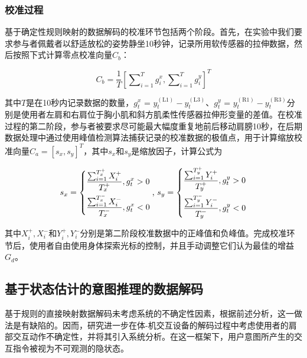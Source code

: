 \subsubsection{校准过程}
基于确定性规则映射的数据解码的校准环节包括两个阶段。首先，在实验中我们要求参与者佩戴者以舒适放松的姿势静坐10秒钟，记录所用软传感器的拉伸数据，然后按照下式计算零点校准向量$C_b$：

\begin{equation}
C_b = \frac{1}{T}{\left[ {\sum\nolimits_{i = 1}^T {{g^x_i}} ,\sum\nolimits_{i = 1}^T {{g^y_i}} } \right]^T}
\label{eq3}
\end{equation}    

其中$T$是在10秒内记录数据的数量，${g^x_t}{\text{ = }}y_t^{({\text{L}}1)} - y_t^{({\text{L}}3)}$、${g^y_t}{\text{ = }}y_t^{({\text{R}}1)} - y_t^{({\text{R}}3)}$分别是使用者左肩和右肩位于胸小肌和斜方肌柔性传感器拉伸形变量的差值。在校准过程的第二阶段，参与者被要求尽可能最大幅度重复地前后移动肩膀10秒，在后期数据处理中通过使用峰值检测算法捕获记录的校准数据的极值点，用于计算缩放校准向量$C_a = {[{s_x},{s_y}]^T}$，其中${s_x}$和${s_y}$是缩放因子，计算公式为

\begin{equation}
{s_x} = \left \{  \begin{gathered}
    \frac{{\sum\nolimits_{i = 1}^{T_x^ + } {X_i^ + } }}{{T_x^ + }},{g^x_t} > 0 \hfill  \\ 
    \frac{{\sum\nolimits_{i = 1}^{T_x^ - } {X_i^ - } }}{{T_x^ - }},{g^x_t} < 0 \hfill  \\  
  \end{gathered}  \right.{\text{, }}{s_y} = \left \{  \begin{gathered}
    \frac{{\sum\nolimits_{i = 1}^{T_y^ + } {Y_i^ + } }}{{T_y^ + }},{g^y_t} > 0 \hfill  \\ 
    \frac{{\sum\nolimits_{i = 1}^{T_y^ - } {Y_i^ - } }}{{T_y^ - }},{g^y_t} < 0 \hfill  \\  
  \end{gathered}  \right.
  \label{eq4}
\end{equation}    

其中$X_i^ + ,X_i^ - $和$Y_i^ + ,Y_i^ - $分别是第二阶段校准数据中的正峰值和负峰值。完成校准环节后，使用者自由使用身体探索光标的控制，并且手动调整它们认为最佳的增益$G_d$。 

\subsection{基于状态估计的意图推理的数据解码}基于规则的直接映射数据解码未考虑系统的不确定性因素，根据前述分析，这一做法是有缺陷的。因而，研究进一步在体-机交互设备的解码过程中考虑使用者的肩部交互动作不确定性，并将其引入系统分析。在这一框架下，用户意图所产生的交互指令被视为不可观测的隐状态。

